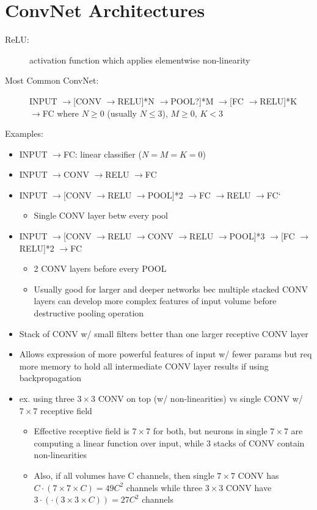 \documentclass[a4paper,12pt]{article}
\newcommand{\lra}{\ensuremath{\longrightarrow{}}}
\begin{document}
\section{ConvNet Architectures}
\begin{description}
  \item[ReLU:] activation function which applies elementwise non-linearity
  \item[Most Common ConvNet:] INPUT \lra [CONV \lra RELU]*N \lra POOL?]*M \lra [FC \lra RELU]*K \lra FC where $N \geq 0$ (usually $N \leq 3$), $M \geq 0$, $K < 3$
\end{description}
Examples:
\begin{itemize}
  \item INPUT \lra FC: linear classifier ($N=M=K=0$)
  \item INPUT \lra CONV \lra RELU \lra FC
  \item INPUT \lra [CONV \lra RELU \lra POOL]*2 \lra FC \lra RELU \lra FC`
  \begin{itemize}
    \item Single CONV layer betw every pool
  \end{itemize}
  \item INPUT \lra [CONV \lra RELU \lra CONV \lra RELU \lra POOL]*3 \lra [FC \lra RELU]*2 \lra FC
  \begin{itemize}
    \item 2 CONV layers before every POOL
    \item Usually good for larger and deeper networks bec multiple stacked CONV layers can develop more complex features of input volume before destructive pooling operation
  \end{itemize}
\end{itemize}

\begin{itemize}
  \item Stack of CONV w/ small filters better than one larger receptive CONV layer
  \item Allows expression of more powerful features of input w/ fewer params but req more memory to hold all intermediate CONV layer results if using backpropagation
  \item ex. using three $3\times 3$ CONV on top (w/ non-linearities) vs single CONV w/ $7\times 7$ receptive field
  \begin{itemize}
    \item Effective receptive field is $7\times 7$ for both, but neurons in single $7\times 7$ are computing a linear function over input, while 3 stacks of CONV contain non-linearities
    \item Also, if all volumes have C channels, then single $7\times 7$ CONV has $C\cdot (7\times 7\times C) = 49C^2$ channels while three $3\times 3$ CONV have $3\cdot(\cdot (3\times 3\times C)) = 27C^2$ channels
  \end{itemize}
\end{itemize}
\end{document}
